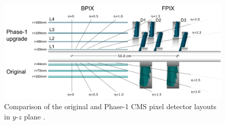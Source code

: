 \begin{figure}[hbtp]
\centering
\includegraphics[scale=0.2]{figures/lhc_and_cms/pixels_layout_comparison.png}
\caption{Comparison of the original and Phase-1 CMS pixel detector layouts in $y$-$z$ plane \cite{cms_phase1_pixels}.}
\label{pixels_original_vs_phase1}
\end{figure}
